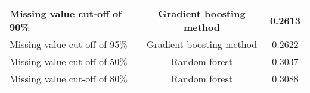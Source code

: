 \documentclass{article}\usepackage[]{graphicx}\usepackage[]{color}
\begin{document}
\begin{table}[ht]
\begin{tabular}{@{}|l|c|c|@{}}
                                                                                                                                                                                                                                                                                                                                                                                                                                                                                                                                                                                                \textbf{Missing value cut-off of 90\%} & \textbf{Gradient boosting method} & \textbf{0.2613} \\
                                                                                                                                                                                                                                                                                                                                                                                                                                                                                                                                                                                                Missing value cut-off of 95\% & Gradient boosting method & 0.2622 \\
                                                                                                                                                                                                                                                                                                                                                                                                                                                                                                                                                                                                Missing value cut-off of 50\% & Random forest & 0.3037 \\ 
                                                                                                                                                                                                                                                                                                                                                                                                                                                                                                                                                                                                Missing value cut-off of 80\% & Random forest & 0.3088 \\

\end{tabular}
\end{table}
\end{document}
